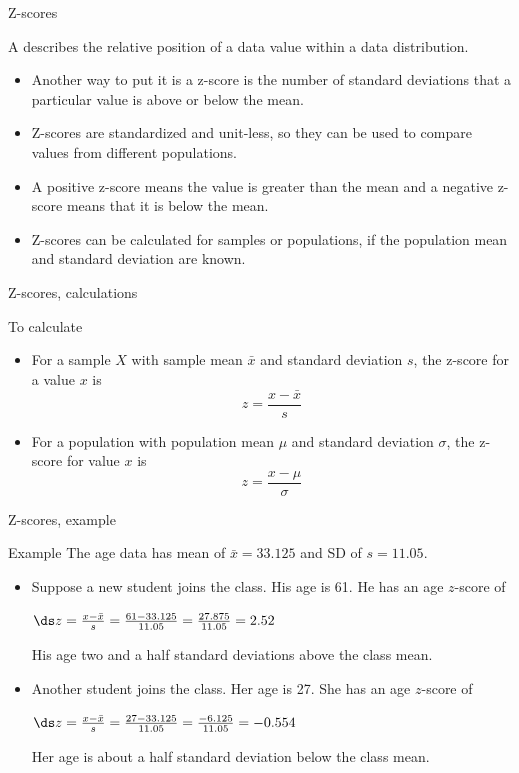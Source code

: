 \documentclass[xcolor=table, handout]{beamer}
\begin{document}
\begin{frame}{Z-scores}
\begin{block}{}
\large
A  describes the relative position of a data value within a data distribution.
\begin{itemize}
\pause
\item Another way to put it is a z-score is the number of standard deviations that a particular value is above or below the mean.
\pause
\item Z-scores are standardized and unit-less, so they can be used to compare values from different populations.
\pause
\item A positive z-score means the value is greater than the mean and a negative z-score means that it is below the mean. 
\pause
\item Z-scores can be calculated for samples or populations, if the population mean and standard deviation are known.
\end{itemize}
\end{block}
\end{frame}

\begin{frame}{Z-scores, calculations}
\begin{block}{To calculate}
\begin{itemize}
\item For a sample $X$ with sample mean $\bar x$ and standard deviation $s$, the z-score for a value $x$ is
\[z = \frac{x - \bar x}{s}\]
\smallskip
\pause
\item For a population with population mean $\mu$ and standard deviation $\sigma$, the z-score for value $x$ is
\[z = \frac{x - \mu}{\sigma}\]
\end{itemize} 
\end{block}
\end{frame}

\begin{frame}{Z-scores, example}
\begin{exampleblock}{Example}
The age data has mean of $\bar x = 33.125$ and SD of $s=11.05$.
\begin{itemize}
\pause
\item Suppose a new student joins the class. His age is 61. He has an age $z$-score of\\
\smallskip
{\centering
$\ds z = \frac{x - \bar x}{s} = \frac {61-33.125}{11.05} = \frac {27.875}{11.05} = 2.52$
\par}
\medskip
\pause
His age two and a half standard deviations above the class mean.
\smallskip
\pause
\item Another student joins the class. Her age is 27. She has an age $z$-score of\\
\smallskip
{\centering
$\ds z = \frac{x - \bar x}{s} = \frac {27-33.125}{11.05} = \frac {-6.125}{11.05} = -0.554$
\par}
\medskip
\pause
Her age is about a half standard deviation below the class mean.
\end{itemize}

\end{exampleblock}
\end{frame}
\end{document}
